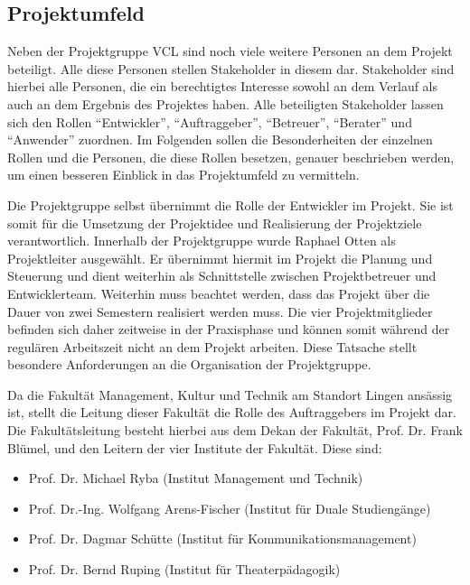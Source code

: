 \clearpage

\subsection{Projektumfeld}
\label{sec:Projektumfeld}

Neben der Projektgruppe \acs{VCL} sind noch viele weitere Personen an dem
Projekt beteiligt. Alle diese Personen stellen Stakeholder in diesem dar.
Stakeholder sind hierbei alle Personen, die ein berechtigtes Interesse sowohl
an dem Verlauf als auch an dem Ergebnis des Projektes haben. Alle
beteiligten Stakeholder lassen sich den Rollen "`Entwickler"', "`Auftraggeber"',
"`Betreuer"', "`Berater"' und "`Anwender"' zuordnen. Im Folgenden sollen die
Besonderheiten der einzelnen Rollen und die Personen, die diese Rollen besetzen,
genauer beschrieben werden, um einen besseren Einblick in das Projektumfeld zu
vermitteln.

Die Projektgruppe selbst übernimmt die Rolle der Entwickler im Projekt. Sie ist
somit für die Umsetzung der Projektidee und Realisierung der Projektziele
verantwortlich. Innerhalb der Projektgruppe wurde Raphael Otten als
Projektleiter ausgewählt. Er übernimmt hiermit im Projekt die Planung und
Steuerung und dient weiterhin als Schnittstelle zwischen Projektbetreuer und
Entwicklerteam. Weiterhin muss beachtet werden, dass das Projekt über die Dauer
von zwei Semestern realisiert werden muss. Die vier Projektmitglieder befinden
sich daher zeitweise in der Praxisphase und können somit während der regulären
Arbeitszeit nicht an dem Projekt arbeiten. Diese Tatsache stellt besondere
Anforderungen an die Organisation der Projektgruppe.

Da die Fakultät Management, Kultur und Technik am Standort Lingen ansässig ist,
stellt die Leitung dieser Fakultät die Rolle des Auftraggebers im Projekt dar.
Die Fakultätsleitung besteht hierbei aus dem Dekan der Fakultät, Prof. Dr. Frank
Blümel, und den Leitern der vier Institute der Fakultät. Diese sind:

\begin{itemize}
  \item Prof. Dr. Michael Ryba (Institut Management und Technik)
  \item Prof. Dr.-Ing. Wolfgang Arens-Fischer (Institut für Duale Studiengänge)
  \item Prof. Dr. Dagmar Schütte (Institut für Kommunikationsmanagement)
  \item Prof. Dr. Bernd Ruping (Institut für Theaterpädagogik)
\end{itemize}


